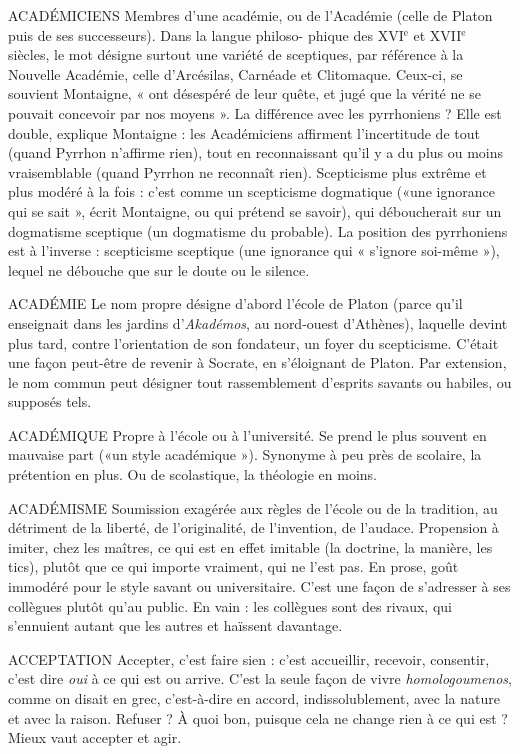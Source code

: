 ACADÉMICIENS Membres d’une académie, ou de l’Académie (celle de
Platon puis de ses successeurs). Dans la langue philoso-
phique des {\footnotesize XVI$^\text{e}$} et {\footnotesize XVII$^\text{e}$} siècles,
le mot désigne surtout une variété de sceptiques,
par référence à la Nouvelle Académie, celle d’Arcésilas, Carnéade et Clitomaque.
Ceux-ci, se souvient Montaigne, « ont désespéré de leur quête, et jugé
que la vérité ne se pouvait concevoir par nos moyens ». La différence avec les
pyrrhoniens ? Elle est double, explique Montaigne : les Académiciens affirment
l'incertitude de tout (quand Pyrrhon n’affirme rien), tout en reconnaissant
qu’il y a du plus ou moins vraisemblable (quand Pyrrhon ne reconnaît rien).
Scepticisme plus extrême et plus modéré à la fois : c’est comme un scepticisme
dogmatique («une ignorance qui se sait », écrit Montaigne, ou qui prétend se
savoir), qui déboucherait sur un dogmatisme sceptique (un dogmatisme du
probable). La position des pyrrhoniens est à l’inverse : scepticisme sceptique
(une ignorance qui « s’ignore soi-même »), lequel ne débouche que sur le doute
ou le silence.

ACADÉMIE Le nom propre désigne d’abord l’école de Platon (parce qu’il
enseignait dans les jardins d’{\it Akadémos}, au nord-ouest d’Athènes),
laquelle devint plus tard, contre l'orientation de son fondateur, un foyer du
scepticisme. C’était une façon peut-être de revenir à Socrate, en s’éloignant de
Platon.
Par extension, le nom commun peut désigner tout rassemblement d’esprits
savants ou habiles, ou supposés tels.

ACADÉMIQUE Propre à l’école ou à l’université. Se prend le plus souvent
en mauvaise part («un style académique »). Synonyme à
peu près de scolaire, la prétention en plus. Ou de scolastique, la théologie en
moins.

ACADÉMISME Soumission exagérée aux règles de l’école ou de la tradition,
au détriment de la liberté, de l’originalité, de l’invention,
de l’audace. Propension à imiter, chez les maîtres, ce qui est en effet imitable
(la doctrine, la manière, les tics), plutôt que ce qui importe vraiment, qui
ne l’est pas. En prose, goût immodéré pour le style savant ou universitaire.
C’est une façon de s'adresser à ses collègues plutôt qu’au public. En vain : les
collègues sont des rivaux, qui s’ennuient autant que les autres et haïssent davantage.

ACCEPTATION Accepter, c’est faire sien : c’est accueillir, recevoir, consentir,
c’est dire {\it oui} à ce qui est ou arrive. C’est la seule façon
de vivre {\it homologoumenos}, comme on disait en grec, c’est-à-dire en accord,
indissolublement, avec la nature et avec la raison. Refuser ? À quoi bon,
puisque cela ne change rien à ce qui est ? Mieux vaut accepter et agir.

